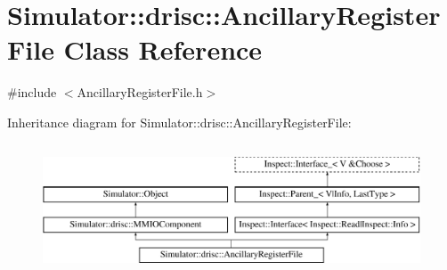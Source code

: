 \hypertarget{class_simulator_1_1drisc_1_1_ancillary_register_file}{\section{Simulator\+:\+:drisc\+:\+:Ancillary\+Register\+File Class Reference}
\label{class_simulator_1_1drisc_1_1_ancillary_register_file}
}


{\ttfamily \#include $<$Ancillary\+Register\+File.\+h$>$}

Inheritance diagram for Simulator\+:\+:drisc\+:\+:Ancillary\+Register\+File\+:\begin{figure}[H]
\begin{center}
\leavevmode
\includegraphics[height=3.929825cm]{class_simulator_1_1drisc_1_1_ancillary_register_file}
\end{center}
\end{figure}

